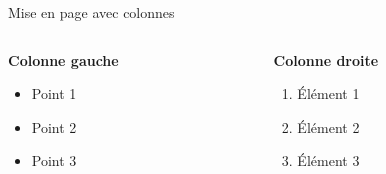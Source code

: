 \documentclass[10pt,aspectratio=169]{beamer}
\begin{document}
\begin{frame}{Mise en page avec colonnes}
\begin{columns}[T]
\begin{column}{0.48\textwidth}
\textbf{Colonne gauche}
\begin{itemize}
    \item Point 1
    \item Point 2
    \item Point 3
\end{itemize}
\end{column}

\begin{column}{0.48\textwidth}
\textbf{Colonne droite}
\begin{enumerate}
    \item Élément 1
    \item Élément 2
    \item Élément 3
\end{enumerate}
\end{column}
\end{columns}
\end{frame}

\begin{frame}[plain]
\end{frame}
\end{document}
